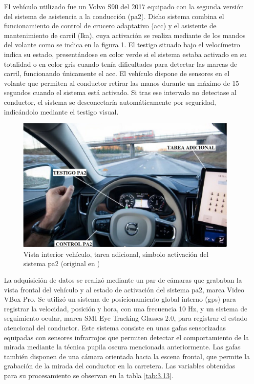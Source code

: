 El vehículo utilizado fue un Volvo S90 del 2017 equipado con la segunda versión del sistema de asistencia a la conducción (\gls{pa2}). Dicho sistema combina el funcionamiento de control de crucero adaptativo (\gls{acc}) y el asistente de mantenimiento de carril (\gls{lka}), cuya activación se realiza mediante de los mandos del volante como se indica en la figura \ref{fig:3.18}. El testigo situado bajo el velocímetro indica su estado, presentándose en color verde si el sistema estaba activado en su totalidad o en color gris cuando tenía dificultades para detectar las marcas de carril, funcionando únicamente el \gls{acc}. El vehículo dispone de sensores en el volante que permiten al conductor retirar las manos durante un máximo de 15 segundos cuando el sistema está activado. Si tras ese intervalo no detectase al conductor, el sistema se desconectaría automáticamente por seguridad, indicándolo mediante el testigo visual. 

\newpage
\begin{figure}[h]
    \centering
    \includegraphics[width=11cm]
    {figures/3.18.png}
    \caption{ \label{fig:3.18} Vista interior vehículo, tarea adicional, símbolo activación del sistema \gls{pa2} (original en \textcite{solismarcos})}
\end{figure}

La adquisición de datos se realizó mediante un par de cámaras que grababan la vista frontal del vehículo y al estado de activación del sistema \gls{pa2}, marca Video VBox Pro. Se utilizó un sistema de posicionamiento global interno (\gls{gps}) para registrar la velocidad, posición y hora, con una frecuencia 10 Hz, y un sistema de seguimiento ocular, marca SMI Eye Tracking Glasses 2.0, para registrar el estado atencional del conductor. Este sistema consiste en unas gafas sensorizadas equipadas con sensores infrarrojos que permiten detectar el comportamiento de la mirada mediante la técnica pupila oscura mencionada anteriormente. Las gafas también disponen de una cámara orientada hacia la escena frontal, que permite la grabación de la mirada del conductor en la carretera. Las variables obtenidas para su procesamiento se observan en la tabla \ref{tab:3.13}.

